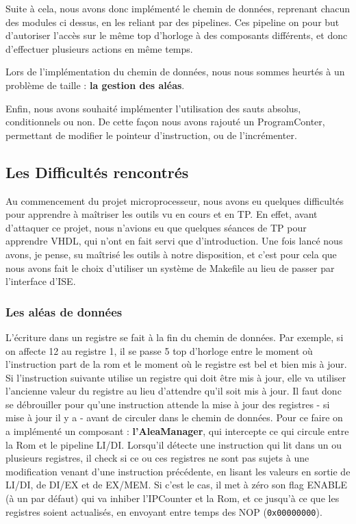     Suite à cela, nous avons donc implémenté le chemin de données, reprenant chacun des modules ci dessus, en les reliant par des pipelines. Ces pipeline on pour but d'autoriser l'accès sur le même top d'horloge à des composants différents, et donc d'effectuer plusieurs actions en même temps.
    
    Lors de l'implémentation du chemin de données, nous nous sommes heurtés à un problème de taille : \textbf{la gestion des aléas}.
    
    Enfin, nous avons souhaité implémenter l'utilisation des sauts absolus, conditionnels ou non. De cette façon nous avons rajouté un ProgramConter, permettant de modifier le pointeur d'instruction, ou de l'incrémenter.
    
    \subsection{Les Difficultés rencontrés}
    Au commencement du projet microprocesseur, nous avons eu quelques difficultés pour apprendre à maîtriser les outils vu en cours et en TP. En effet, avant d'attaquer ce projet, nous n'avions eu que quelques séances de TP pour apprendre VHDL, qui n'ont en fait servi que d'introduction. Une fois lancé nous avons, je pense, su maîtrisé les outils à notre disposition, et c'est pour cela que nous avons fait le choix d'utiliser un système de Makefile au lieu de passer par l'interface d'ISE.
    
   \subsubsection*{Les aléas de données}
   L'écriture dans un registre se fait à la fin du chemin de données. Par exemple, si on affecte 12 au registre 1, il se passe 5 top d'horloge entre le moment où l'instruction part de la rom et le moment où le registre est bel et bien mis à jour. Si l'instruction suivante utilise un registre qui doit être mis à jour, elle va utiliser l'ancienne valeur du registre au lieu d'attendre qu'il soit mis à jour. Il faut donc se débrouiller pour qu'une instruction attende la mise à jour des registres - si mise à jour il y a - avant de circuler dans le chemin de données.
   Pour ce faire on a implémenté un composant : \textbf{l'AleaManager}, qui intercepte ce qui circule entre la Rom et le pipeline LI/DI. Lorsqu'il détecte une instruction qui lit dans un ou plusieurs registres, il check si ce ou ces registres ne sont pas sujets à une modification venant d'une instruction précédente, en lisant les valeurs en sortie de LI/DI, de DI/EX et de EX/MEM.
   Si c'est le cas, il met à zéro son flag ENABLE (à un par défaut) qui va inhiber l'IPCounter et la Rom, et ce jusqu'à ce que les registres soient actualisés, en envoyant entre temps des NOP (\texttt{0x00000000}).
   
